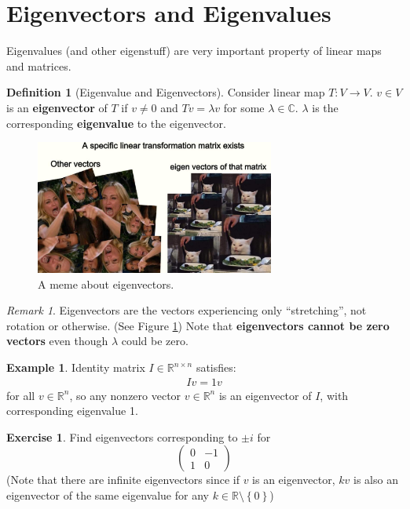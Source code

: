 \documentclass[12pt, a4paper]{article}
\newcommand{\R}{\mathbb{R}}
\theoremstyle{remark}
\newtheorem{remark}{Remark}
\theoremstyle{definition}
\newtheorem{definition}{Definition}
\newtheorem{example}{Example}
\newtheorem{exercise}{Exercise}
\numberwithin{equation}{section}
\numberwithin{definition}{section}
\numberwithin{example}{section}
\numberwithin{exercise}{section}
\numberwithin{remark}{section}
\numberwithin{figure}{section}
\begin{document}
\section{Eigenvectors and Eigenvalues}
Eigenvalues (and other eigenstuff) are very important property of linear maps and matrices.
\begin{definition}[Eigenvalue and Eigenvectors]
    Consider linear map $T : V \rightarrow V$.
    $v \in V$ is an \textbf{eigenvector} of $T$ if $v \neq 0$ and $Tv = \lambda v$ for some $\lambda \in \mathbb{C}$.
    $\lambda$ is the corresponding \textbf{eigenvalue} to the eigenvector.
\end{definition}
\begin{figure}[h]
    \centering
    \includegraphics[width=0.7\textwidth]{EigenvectorMeme}
    \caption{A meme about eigenvectors.}
    \label{fig: Eigenvector Meme}
\end{figure}
\begin{remark}
Eigenvectors are the vectors experiencing only ``stretching'', not rotation or otherwise.
(See Figure \ref{fig: Eigenvector Meme})
Note that \textbf{eigenvectors cannot be zero vectors} even though $\lambda$ could be zero.
\end{remark}
\begin{example}
    Identity matrix $I \in \R^{n \times n}$ satisfies:
    \begin{align*}
        Iv = 1v
    \end{align*}
    for all $v \in \R^n$, so any nonzero vector $v \in \R^n$ is an eigenvector of $I$,
    with corresponding eigenvalue 1.
\end{example}
\begin{exercise}
    Find eigenvectors corresponding to $\pm i$ for
    \begin{equation*}
        \begin{pmatrix}
            0 & -1 \\ 1 & 0
        \end{pmatrix}
    \end{equation*}
    (Note that there are infinite eigenvectors since if $v$ is an eigenvector, $kv$ is also an eigenvector of the same eigenvalue for any $k \in \R \setminus \left\{ 0 \right\}$)
\end{exercise}
\end{document}
